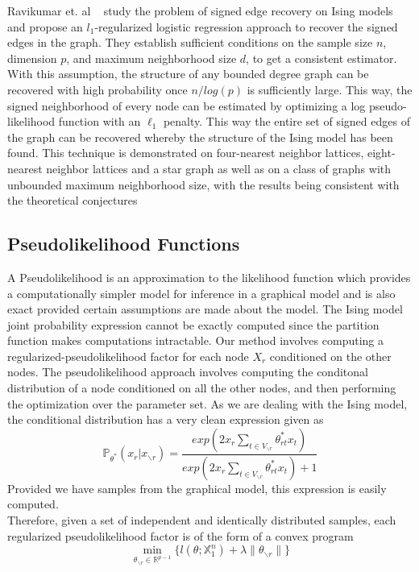 \documentclass[11pt]{article}
\begin{document}
Ravikumar et. al ~\cite{ravikumar2010high} study the problem of signed edge recovery on Ising models and propose an $l_1$-regularized logistic regression approach to recover the signed edges in the graph.
They establish sufficient conditions on the sample size $n$, dimension $p$, and maximum neighborhood size $d$, to get a consistent estimator.
With this assumption, the structure of any bounded degree graph can be recovered with high probability once $n/log(p)$ is sufficiently large. 
This way, the signed neighborhood of every node can be estimated by optimizing a log pseudo-likelihood function with an $\ell_1$ penalty.
This way the entire set of signed edges of the graph can be recovered whereby the structure of the Ising model has been found.
This technique is demonstrated on four-nearest neighbor lattices, eight-nearest neighbor lattices and a star graph as well as on a class of graphs with unbounded maximum neighborhood size, with the results being consistent with the theoretical conjectures


\subsection{Pseudolikelihood Functions}

A Pseudolikelihood is an approximation to the likelihood function which provides a computationally simpler model for inference in a graphical model and is also exact provided certain assumptions are made about the model. 
The Ising model joint probability expression cannot be exactly computed since the partition function makes computations intractable.
Our method involves computing a regularized-pseudolikelihood factor for each node $X_r$ conditioned on the other nodes.
The pseudolikelihood approach involves computing the conditonal distribution of a node conditioned on all the other nodes, and then performing the optimization over the parameter set.
As we are dealing with the Ising model, the conditional distribution has a very clean expression given as 
$$ \mathbb{P_{\theta^*}}( x_r | x_{\backslash r}) = \frac{exp(2x_r \sum\limits_{t \in V_{\backslash r}} \theta^*_{rt} x_t )}{exp(2x_r \sum\limits_{t \in V_{\backslash r}} \theta^*_{rt} x_t ) + 1}  $$ 
Provided we have samples from the graphical model, this expression is easily computed.\\
Therefore, given a set of independent and identically distributed samples,  each regularized pseudolikelihood factor is of the form of a convex program 
$$ \min_{\theta_{\backslash r} \in \mathbb{R}^{p-1}} \{ l(\theta; \mathbb{X}^n_1) + \lambda \|{ \theta_{\backslash r} }\| \} $$
\end{document}
